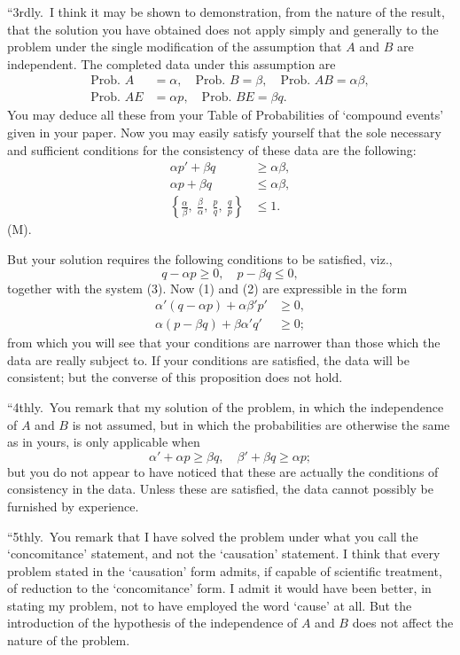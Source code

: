 \documentclass[11pt,a4paper]{article}
\theoremstyle{plain}
\begin{document}
``3rdly.\ I think it may be shown to demonstration, from the nature of the result, that the solution you have obtained does not apply simply and generally to the problem under the single modification of the assumption that $A$ and $B$ are independent. The completed data under this assumption are
\begin{align*}
\text{Prob.\ } A &= \alpha, \quad \text{Prob.\ } B = \beta, \quad \text{Prob.\ } AB = \alpha\beta, \\
\text{Prob.\ } AE &= \alpha p, \quad \text{Prob.\ } BE = \beta q.
\end{align*}
You may deduce all these from your Table of Probabilities of `compound events' given in your paper. Now you may easily satisfy yourself that the sole necessary and sufficient conditions for the consistency of these data are the following:
\begin{align}
\alpha p' + \beta q &\geq \alpha\beta, \tag{1}\\
\alpha p + \beta q &\leq \alpha\beta, \tag{2}\\
\left\{\frac{\alpha}{\beta},\ \frac{\beta}{\alpha},\ \frac{p}{q},\ \frac{q}{p}\right\} &\leq 1. \tag{3}
\end{align}
\hfill (M).

But your solution requires the following conditions to be satisfied, viz.,
\[
q - \alpha p \geq 0, \quad p - \beta q \leq 0,
\]
together with the system (3). Now (1) and (2) are expressible in the form
\begin{align*}
\alpha'(q - \alpha p) + \alpha\beta' p' &\geq 0, \\
\alpha(p - \beta q) + \beta\alpha' q' &\geq 0;
\end{align*}
from which you will see that your conditions are narrower than those which the data are really subject to. If your conditions are satisfied, the data will be consistent; but the converse of this proposition does not hold.

\newpage
``4thly.\ You remark that my solution of the problem, in which the independence of $A$ and $B$ is not assumed, but in which the probabilities are otherwise the same as in yours, is only applicable when
\[
\alpha' + \alpha p \geq \beta q, \quad \beta' + \beta q \geq \alpha p;
\]
but you do not appear to have noticed that these are actually the conditions of consistency in the data. Unless these are satisfied, the data cannot possibly be furnished by experience.

``5thly.\ You remark that I have solved the problem under what you call the `concomitance' statement, and not the `causation' statement. I think that every problem stated in the `causation' form admits, if capable of scientific treatment, of reduction to the `concomitance' form. I admit it would have been better, in stating my problem, not to have employed the word `cause' at all. But the introduction of the hypothesis of the independence of $A$ and $B$ does not affect the nature of the problem.
\end{document}
